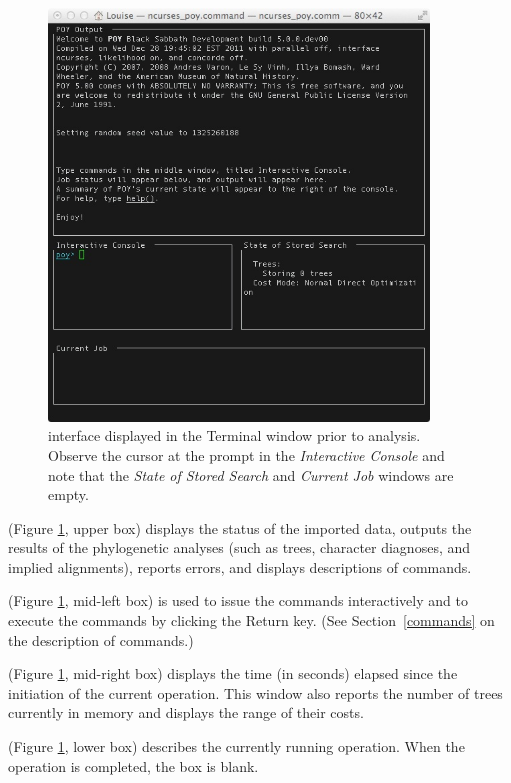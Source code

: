 {\begin{figure}[htbp]
   \centering
   \includegraphics[width=0.9\textwidth]{doc/figures/figinterface.jpg}
   \caption{\poy interface displayed in the Terminal window prior to analysis. Observe the cursor at the \poy prompt 
   in the \emph{Interactive Console} and note that the \emph{State of Stored Search} and \emph{Current Job} windows are empty.}
   \label{fig:figinterface}
\end{figure}

\begin{description}
\setlength{\labelsep}{5pt}
\setlength{\itemindent}{0pt}%
\item[POY Output] (Figure \ref{fig:figinterface}, upper box) displays the status of the imported data, outputs the results 
of the phylogenetic analyses (such as trees, character diagnoses, and implied alignments), reports errors, and displays 
descriptions of \poy commands.
\item[Interactive Console] (Figure \ref{fig:figinterface}, mid-left box) is used to issue the commands interactively and to 
execute the commands by clicking the Return key. (See Section~\ref{commands} on the description of \poy commands.)
\item[State of Stored Search] (Figure \ref{fig:figinterface}, mid-right box) displays the time (in seconds) elapsed since 
the initiation of the current operation. This window also reports the number of trees currently in memory and displays 
the range of their costs.
\item[Current Job] (Figure \ref{fig:figinterface}, lower box) describes the currently running operation. When the operation 
is completed, the box is blank.
\end{description} 

}
